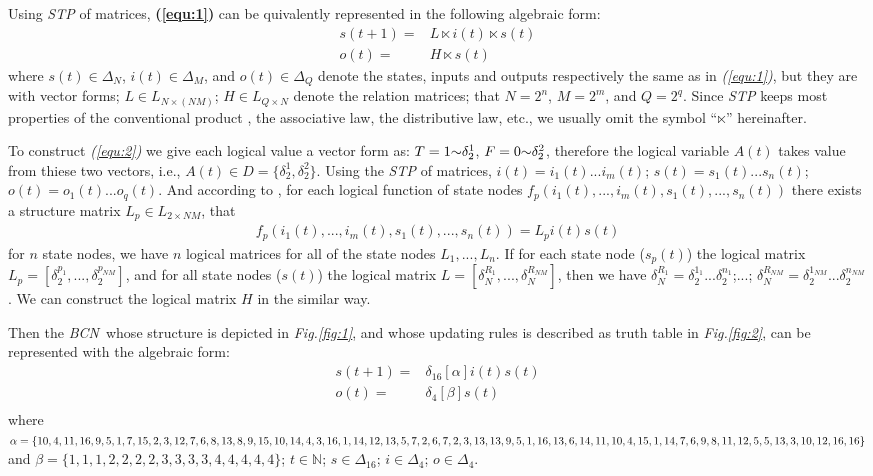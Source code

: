 \documentclass[conference]{IEEEtran} %
\def \BCN {{\em BCN}}
\begin{document}
Using {\em STP} of matrices, {\bf (\ref{equ:1})} can be quivalently represented in the following algebraic form:
\begin{equation}
\begin{split}
s(t+1)=&L\ltimes{i(t)}\ltimes{s(t)}\\
o(t)=&H\ltimes{s(t)}
\end{split}
\label{equ:2}
\end{equation}
where $s(t)\in\Delta_N$, $i(t)\in\Delta_M$, and  $o(t)\in\Delta_Q$ denote the states, inputs and outputs respectively the same as in {\em (\ref{equ:1})}, but they are with vector forms; $L\in L_{N\times\left(NM\right)}$; $H\in L_{Q\times N}$ denote the relation matrices; that $N=2^n$, $M=2^m$, and $Q=2^q$. Since {\em STP} keeps most properties of the conventional product \cite{Cheng2011Analysis}, the associative law, the distributive law, etc., we usually omit the symbol ``$\ltimes$'' hereinafter.

To construct {\em (\ref{equ:2})} we give each logical value a vector form as: $T = 1 \scriptsize{\sim} \delta_2^1$, $F = 0 \scriptsize{\sim} \delta_2^2$, therefore the logical variable $A(t)$ takes value from thiese two vectors, i.e., $A(t)\in D=\{\delta_2^1, \delta_2^2\}$. Using the {\em STP} of matrices, $i(t)=i_1(t)...i_m(t)$; $s(t)=s_1(t)...s_n(t)$; $o(t)=o_1(t)...o_q(t)$. And according to \cite{Cheng2003Semi}, for each logical function of state nodes $f_p(i_1(t),...,i_m(t),s_1(t),...,s_n(t))$ there exists a structure matrix $L_p\in L_{2\times {NM}}$, that
\begin{equation}
\begin{split}
f_p(i_1(t),...,i_m(t),s_1(t),...,s_n(t))=L_pi(t)s(t)
\end{split}
\end{equation}
for $n$ state nodes, we have $n$ logical matrices for all of the state nodes $L_1,...,L_n$. If for each state node ($s_p(t)$) the logical matrix $L_p=[\delta_2^{p_1},...,\delta_2^{p_{NM}}]$, and for all state nodes ($s(t)$) the logical matrix $L=[\delta_N^{R_1},...,\delta_N^{R_{NM}}]$, then we have $\delta_N^{R_1}=\delta_2^{1_1}...\delta_2^{n_1}$;...; $\delta_N^{R_{NM}}=\delta_2^{1_{NM}}...\delta_2^{n_{NM}}$. We can construct the logical matrix $H$ in the similar way.

Then the \BCN\ whose structure is depicted in {\em Fig.\ref{fig:1}}, and whose updating rules is described as truth table in {\em Fig.\ref{fig:2}}, can be represented with the algebraic form:
\begin{equation}
\begin{split}
s(t+1) =&\delta_{16}[\alpha]i(t)s(t)\\
o(t) =&\delta_4[\beta]s(t)\\
\end{split}
\end{equation}
where $\alpha=\{10,4,11,16,9,5,1, 7,15,2,3,12,7,6,8,13,8,9,\\15,10,14,4,3,16,1,14,12,13,5,7,2,6,7,2,3,13,13,9,5,1,\\16,13 ,6,14,11,10,4,15,1,14 ,7,6,9 ,8,11,12,5,5,13,3,10,\\12,16,16\}$ and $\beta=\{1,1,1,2,2,2,2,3,3,3,3,4,4,4,4,4\}$; $t\in \mathbb{N}$; $s\in \Delta_{16}$; $i\in \Delta_4$; $o\in \Delta_4$.
\end{document}
